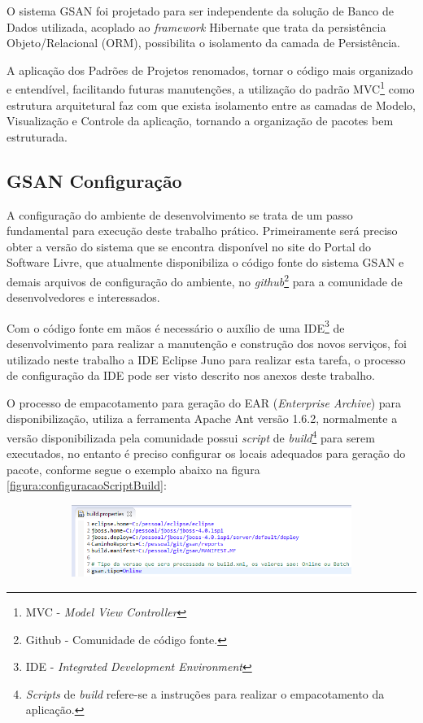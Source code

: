 O sistema GSAN foi projetado para ser independente da solução de Banco de Dados utilizada, acoplado ao \textit{framework} Hibernate que trata da persistência Objeto/Relacional (ORM), possibilita o isolamento da camada de Persistência.

A aplicação dos Padrões de Projetos renomados, tornar o código mais organizado e entendível, facilitando futuras manutenções, a utilização do padrão MVC\footnote{MVC - \textit{Model View Controller}} como estrutura arquitetural faz com que exista isolamento entre as camadas de Modelo, Visualização e Controle da aplicação, tornando a organização de pacotes bem estruturada.
	
	
\subsection{\textbf{GSAN Configuração}}
A configuração do ambiente de desenvolvimento se trata de um passo fundamental para execução deste trabalho prático. Primeiramente será preciso obter a versão do sistema que se encontra disponível no site do Portal do Software Livre, que atualmente disponibiliza o código fonte do sistema GSAN e demais arquivos de configuração do ambiente, no \textit{github}\footnote{Github - Comunidade de código fonte.} para a comunidade de desenvolvedores e interessados. 

Com o código fonte em mãos é necessário o auxílio de uma IDE\footnote{IDE - \textit{Integrated Development Environment}} de desenvolvimento para realizar a manutenção e construção dos novos serviços, foi utilizado neste trabalho a IDE Eclipse Juno para realizar esta tarefa, o processo de configuração da IDE pode ser visto descrito nos anexos deste trabalho.

O processo de empacotamento para geração do EAR (\textit{Enterprise Archive}) para disponibilização, utiliza a ferramenta Apache Ant versão 1.6.2, normalmente a versão disponibilizada pela comunidade possui \textit{script} de \textit{build}\footnote{\textit{Scripts} de \textit{build} refere-se a instruções para realizar o empacotamento da aplicação.} para serem executados, no entanto é preciso configurar os locais adequados para geração do pacote, conforme segue o exemplo abaixo na figura \ref{figura:configuracaoScriptBuild}:

\begin{figure}[H]
	\centering
	\caption{\textbf{Exemplo de configuração do \textit{script} build}}
	\label{figura:configuracaoScriptBuild}	
	\begin{subfigure}[H]{\textwidth}
		\centering
		\includegraphics{figuras/build_properties.png}
	\end{subfigure}
\end{figure}
	
